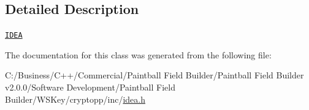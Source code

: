 \subsection{Detailed Description}
\href{http://www.weidai.com/scan-mirror/cs.html#IDEA}{\tt IDEA} 

The documentation for this class was generated from the following file:\begin{DoxyCompactItemize}
\item 
C:/Business/C++/Commercial/Paintball Field Builder/Paintball Field Builder v2.0.0/Software Development/Paintball Field Builder/WSKey/cryptopp/inc/\hyperlink{idea_8h}{idea.h}\end{DoxyCompactItemize}
